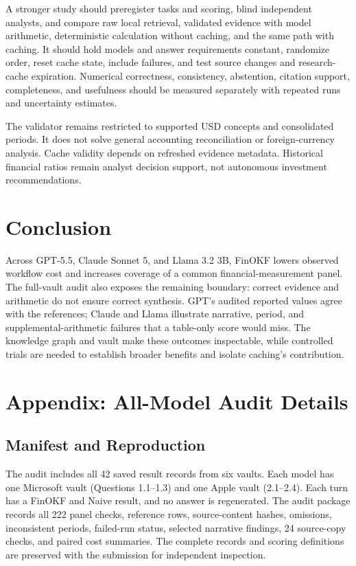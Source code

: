 \documentclass[letterpaper]{article} %
\begin{document}
A stronger study should preregister tasks and scoring, blind independent analysts, and compare raw local retrieval, validated evidence with model arithmetic, deterministic calculation without caching, and the same path with caching. It should hold models and answer requirements constant, randomize order, reset cache state, include failures, and test source changes and research-cache expiration. Numerical correctness, consistency, abstention, citation support, completeness, and usefulness should be measured separately with repeated runs and uncertainty estimates.

The validator remains restricted to supported USD concepts and consolidated periods. It does not solve general accounting reconciliation or foreign-currency analysis. Cache validity depends on refreshed evidence metadata. Historical financial ratios remain analyst decision support, not autonomous investment recommendations.

\section{Conclusion}
Across GPT-5.5, Claude Sonnet 5, and Llama 3.2 3B, FinOKF lowers observed workflow cost and increases coverage of a common financial-measurement panel. The full-vault audit also exposes the remaining boundary: correct evidence and arithmetic do not ensure correct synthesis. GPT's audited reported values agree with the references; Claude and Llama illustrate narrative, period, and supplemental-arithmetic failures that a table-only score would miss. The knowledge graph and vault make these outcomes inspectable, while controlled trials are needed to establish broader benefits and isolate caching's contribution.

\nocite{patro2024financial}
\nocite{google2026okf}


\appendix
\section{Appendix: All-Model Audit Details}
\subsection{Manifest and Reproduction}
The audit includes all 42 saved result records from six vaults. Each model has one Microsoft vault (Questions 1.1--1.3) and one Apple vault (2.1--2.4). Each turn has a FinOKF and Naive result, and no answer is regenerated. The audit package records all 222 panel checks, reference rows, source-content hashes, omissions, inconsistent periods, failed-run status, selected narrative findings, 24 source-copy checks, and paired cost summaries. The complete records and scoring definitions are preserved with the submission for independent inspection.
\end{document}
